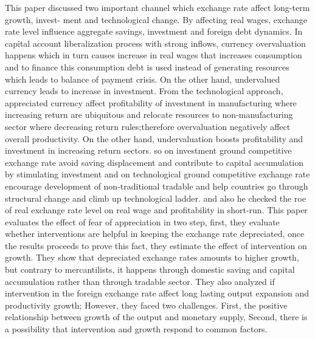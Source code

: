 \documentclass{article}
\begin{document}
This paper discussed two important channel which exchange rate affect long-term growth, invest- ment and technological change. By affecting real wages, exchange rate level influence aggregate savings, investment and foreign debt dynamics. In capital account liberalization process with strong inflows, currency overvaluation happens which in turn causes increase in real wages that increases consumption and to finance this consumption debt is used instead of generating resources which leads to balance of payment crisis. On the other hand, undervalued currency leads to increase in investment. From the technological approach, appreciated currency affect profitability of investment in manufacturing where increasing return are ubiquitous and relocate resources to non-manufacturing sector where decreasing return rules;therefore overvaluation negatively affect overall productivity. On the other hand, undervaluation boosts profitability and investment in increasing return sectors. so on investment ground competitive exchange rate avoid saving displacement and contribute to capital accumulation by stimulating investment and on technological ground competitive exchange rate encourage development of non-traditional tradable and help countries go through structural change and climb up technological ladder. and also he checked the roe of real exchange rate level on real wage and profitability in short-run. \cite {eduardo2007fear}This paper evaluates the effect of fear of appreciation in two step, first, they evaluate whether interventions are helpful in keeping the exchange rate depreciated, once the results proceeds to prove this fact, they estimate the effect of intervention on growth. They show that depreciated exchange rates amounts to higher growth, but contrary to mercantilists, it happens through domestic saving and capital accumulation rather than through tradable sector. They also analyzed if intervention in the foreign exchange rate affect long lasting output expansion and productivity growth; However, they faced two challenges. First, the positive relationship between growth of the output and monetary supply, Second, there is a possibility that intervention and growth respond to common factors.
\end{document}
